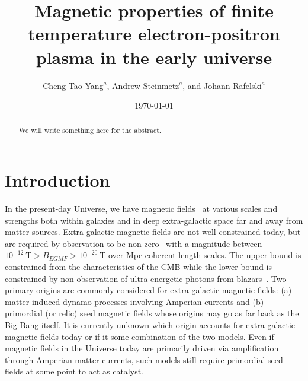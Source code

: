 \documentclass[twocolumn,preprintnumbers,amsmath,amssymb]{revtex4-2}
\begin{document}
\title{Magnetic properties of finite temperature electron-positron plasma in the early universe}
\author{Cheng Tao Yang$^a$, Andrew Steinmetz$^a$, and Johann Rafelski$^a$}


\date{\today}


\begin{abstract}
We will write something here for the abstract.
\end{abstract}
\maketitle

\section{Introduction}
In the present-day Universe, we have magnetic fields~\cite{Kronberg:1993vk} at various scales and strengths both within galaxies and in deep extra-galactic space far and away from matter sources. Extra-galactic magnetic fields are not well constrained today, but are required by observation to be non-zero~\cite{Anchordoqui:2001bs,Widrow:2002ud} with a magnitude between $10^{-12}\ \mathrm{T}>B_{EGMF}>10^{-20}\ \mathrm{T}$ over Mpc coherent length scales. The upper bound is constrained from the characteristics of the CMB while the lower bound is constrained by non-observation of ultra-energetic photons from blazars~\cite{Neronov:2010gir}.
Two primary origins are commonly considered for extra-galactic magnetic fields\cite{Widrow:2011hs,Vazza:2021vwy}:  (a) matter-induced dynamo processes involving Amperian currents and (b) primordial (or relic) seed magnetic fields whose origins may go as far back as the Big Bang itself. It is currently unknown which origin accounts for extra-galactic magnetic fields today or if it some combination of the two models. Even if magnetic fields in the Universe today are primarily driven via amplification through Amperian matter currents, such models still require primordial seed fields at some point to act as catalyst.
\end{document}
